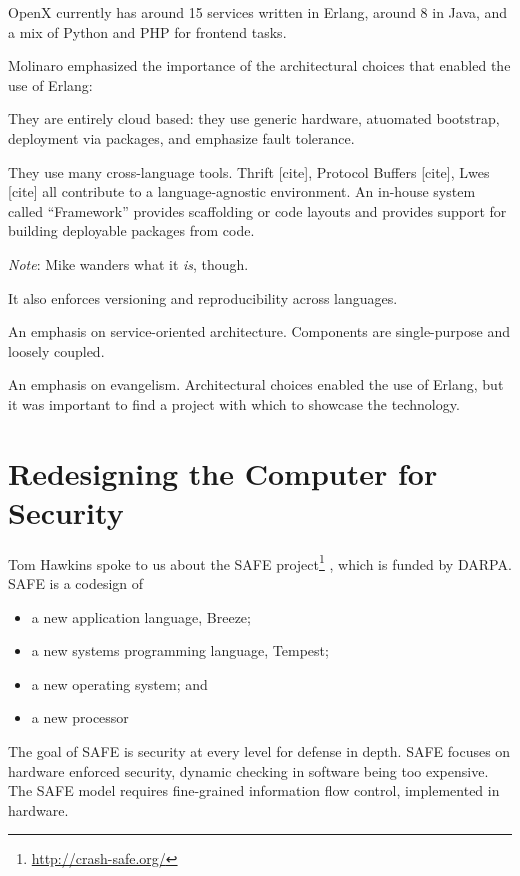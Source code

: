 \documentclass{jfp1}
\newenvironment{ipar}[0]%
 {\begin{list}{}%
 {\setlength{\leftmargin}{1cm}}%
\item[]%
 }
 {\end{list}}
\newcommand\needcite{{\color{red} [cite]}\xspace}
\newcommand{\note}[1]{ \begin{ipar}  {\color{Gray} \textit{Note}: #1} \end{ipar}}
\begin{document}
OpenX currently has around 15 services written in Erlang, around 8 in
Java, and a mix of Python and PHP for frontend tasks.

Molinaro emphasized the importance of the architectural choices that
enabled the use of Erlang:

\begin{itemize}

\item They are entirely cloud based: they use generic hardware,
atuomated bootstrap, deployment via packages, and emphasize fault
tolerance.

\item They use many cross-language tools. Thrift\needcite, Protocol
Buffers\needcite, Lwes\needcite all contribute to a language-agnostic
environment. An in-house system called ``Framework'' provides
scaffolding or code layouts and provides support for building
deployable packages from code.  \note{Mike wanders what it \emph{is},
  though.}
It also enforces versioning and
reproducibility across languages.

\item An emphasis on service-oriented architecture. Components are
single-purpose and loosely coupled.

\item An emphasis on evangelism. Architectural choices enabled the use
of Erlang, but it was important to find a project with which to
showcase the technology.

\end{itemize}

\section{Redesigning the Computer for Security}


Tom Hawkins spoke to us about the SAFE
project\footnote{\url{http://crash-safe.org/}} , which is funded by
DARPA. SAFE is a codesign of

\begin{itemize}
\item a new application language, Breeze;
\item a new systems programming language, Tempest;
\item a new operating system; and
\item a new processor 
\end{itemize}

The goal of SAFE is security at every level for defense in depth.
SAFE focuses on hardware enforced security, dynamic checking
in software being too expensive. The SAFE model requires fine-grained
information flow control, implemented in hardware.
\end{document}
